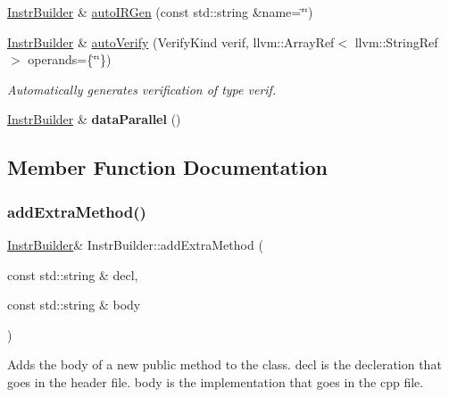 \begin{DoxyCompactItemize}
\item 
\hyperlink{class_instr_builder}{Instr\+Builder} \& \hyperlink{class_instr_builder_a69a849ba19e3bc7b6ec7edf64dc918a3}{auto\+I\+R\+Gen} (const std\+::string \&name=\char`\"{}\char`\"{})
\item 
\mbox{\label{class_instr_builder_a042d784155a9aed4fa81eb5b5e5d52c7}} 
\hyperlink{class_instr_builder}{Instr\+Builder} \& \hyperlink{class_instr_builder_a042d784155a9aed4fa81eb5b5e5d52c7}{auto\+Verify} (Verify\+Kind verif, llvm\+::\+Array\+Ref$<$ llvm\+::\+String\+Ref $>$ operands=\{\char`\"{}\char`\"{}\})
\begin{DoxyCompactList}\small\item\em Automatically generates verification of type {\ttfamily verif}. \end{DoxyCompactList}\item 
\mbox{\label{class_instr_builder_a5ac95624a7a1bfe205fc58716e36eb98}} 
\hyperlink{class_instr_builder}{Instr\+Builder} \& {\bfseries data\+Parallel} ()
\end{DoxyCompactItemize}


\subsection{Member Function Documentation}
\mbox{\label{class_instr_builder_a77e1fdbb84273840f54d90c540ea2425}} 
\subsubsection{\texorpdfstring{add\+Extra\+Method()}{addExtraMethod()}}
{\footnotesize\ttfamily \hyperlink{class_instr_builder}{Instr\+Builder}\& Instr\+Builder\+::add\+Extra\+Method (\begin{DoxyParamCaption}\item[{const std\+::string \&}]{decl,  }\item[{const std\+::string \&}]{body }\end{DoxyParamCaption})\hspace{0.3cm}{\ttfamily [inline]}}

Adds the body of a new public method to the class. {\ttfamily decl} is the decleration that goes in the header file. {\ttfamily body} is the implementation that goes in the cpp file. \mbox{\label{class_instr_builder_af63ba41d5319382fb69e88a41d1703d7}} 
